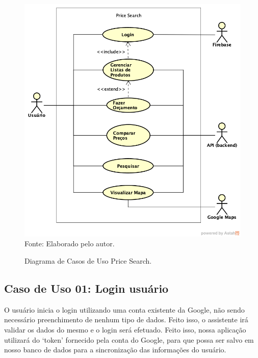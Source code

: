 \begin{figure}[!htb]
\centering
\caption{Diagrama de Casos de Uso Price Search.}
\includegraphics[width=\linewidth]{figuras/DiagramaCasosUsoPriceSearch.png}
{\footnotesize Fonte: Elaborado pelo autor.}
\end{figure}

\subsection{Caso de Uso 01: Login usuário}

O usuário inicia o login utilizando uma conta existente da Google, não sendo necessário preenchimento de nenhum tipo de dados. Feito isso, o assistente irá validar os dados do mesmo e o login será efetuado. Feito isso, nossa aplicação utilizará do ‘token’ fornecido pela conta do Google, para que possa ser salvo em nosso banco de dados para a sincronização das informações do usuário.

